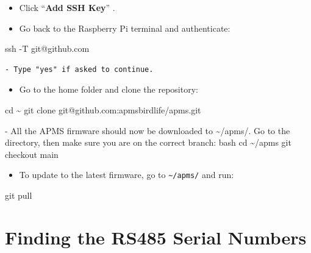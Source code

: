 \documentclass[
  letterpaper,
]{scrbook}
\newenvironment{Shaded}{\begin{snugshade}}{\end{snugshade}}
\newcommand{\AttributeTok}[1]{\textcolor[rgb]{0.40,0.45,0.13}{#1}}
\newcommand{\BuiltInTok}[1]{\textcolor[rgb]{0.00,0.23,0.31}{#1}}
\newcommand{\ExtensionTok}[1]{\textcolor[rgb]{0.00,0.23,0.31}{#1}}
\newcommand{\FunctionTok}[1]{\textcolor[rgb]{0.28,0.35,0.67}{#1}}
\newcommand{\KeywordTok}[1]{\textcolor[rgb]{0.00,0.23,0.31}{\textbf{#1}}}
\newcommand{\NormalTok}[1]{\textcolor[rgb]{0.00,0.23,0.31}{#1}}
\providecommand{\tightlist}{%
  \setlength{\itemsep}{0pt}\setlength{\parskip}{0pt}}
\begin{document}
\begin{itemize}
\item
  Click ``\textbf{Add SSH Key}'' .
\item
  Go back to the Raspberry Pi terminal and authenticate:
\end{itemize}

\begin{Shaded}
\begin{Highlighting}[]
\FunctionTok{ssh} \AttributeTok{{-}T}\NormalTok{ git@github.com}
\end{Highlighting}
\end{Shaded}

\begin{verbatim}
- Type "yes" if asked to continue.
\end{verbatim}

\begin{itemize}
\tightlist
\item
  Go to the home folder and clone the repository:
\end{itemize}

\begin{Shaded}
\begin{Highlighting}[]
\BuiltInTok{cd}\NormalTok{ \textasciitilde{}}
\FunctionTok{git}\NormalTok{ clone git@github.com:apmsbirdlife/apms.git}


\ExtensionTok{{-}}\NormalTok{   All the APMS firmware should now be downloaded to }\KeywordTok{\textasciigrave{}}\ExtensionTok{\textasciitilde{}/apms/.}\KeywordTok{\textasciigrave{}}\NormalTok{ Go to the directory, then make sure you are on the correct branch: }
\KeywordTok{\textasciigrave{}\textasciigrave{}\textasciigrave{}}\FunctionTok{bash}
\BuiltInTok{cd}\NormalTok{ \textasciitilde{}/apms}
\FunctionTok{git}\NormalTok{ checkout main}
\end{Highlighting}
\end{Shaded}

\begin{itemize}
\tightlist
\item
  To update to the latest firmware, go to
  \texttt{\textasciitilde{}/apms/} and run:
\end{itemize}

\begin{Shaded}
\begin{Highlighting}[]
\FunctionTok{git}\NormalTok{ pull}
\end{Highlighting}
\end{Shaded}

\section{Finding the RS485 Serial
Numbers}\label{finding-the-rs485-serial-numbers}
\end{document}
